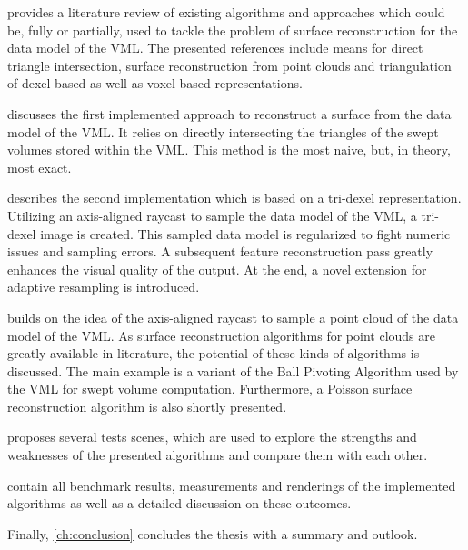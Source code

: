  provides a literature review of existing algorithms and approaches which could be, fully or partially, used to tackle the problem of surface reconstruction for the data model of the VML.
The presented references include means for direct triangle intersection, surface reconstruction from point clouds and triangulation of dexel-based as well as voxel-based representations.

 discusses the first implemented approach to reconstruct a surface from the data model of the VML.
It relies on directly intersecting the triangles of the swept volumes stored within the VML.
This method is the most naive, but, in theory, most exact.

 describes the second implementation which is based on a tri-dexel representation.
Utilizing an axis-aligned raycast to sample the data model of the VML, a tri-dexel image is created.
This sampled data model is regularized to fight numeric issues and sampling errors.
A subsequent feature reconstruction pass greatly enhances the visual quality of the output.
At the end, a novel extension for adaptive resampling is introduced.

 builds on the idea of the axis-aligned raycast to sample a point cloud of the data model of the VML.
As surface reconstruction algorithms for point clouds are greatly available in literature, the potential of these kinds of algorithms is discussed.
The main example is a variant of the Ball Pivoting Algorithm used by the VML for swept volume computation.
Furthermore, a Poisson surface reconstruction algorithm is also shortly presented.

 proposes several tests scenes, which are used to explore the strengths and weaknesses of the presented algorithms and compare them with each other.

 contain all benchmark results, measurements and renderings of the implemented algorithms as well as a detailed discussion on these outcomes.

Finally, \cref{ch:conclusion} concludes the thesis with a summary and outlook.
